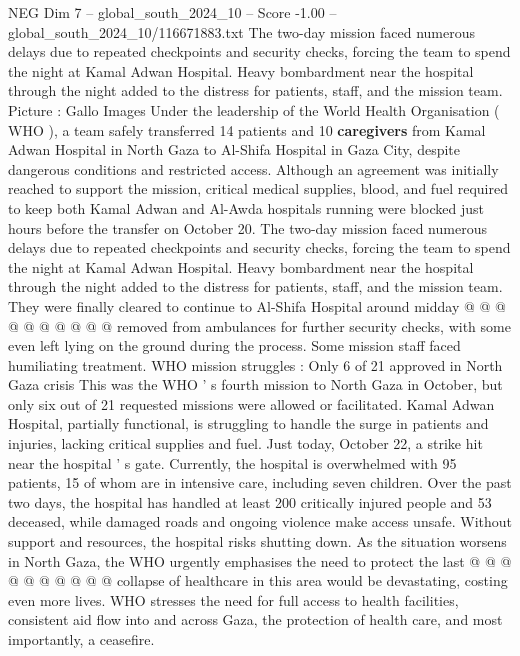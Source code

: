 \begin{textsample}{NEG Dim 7 – global\_south\_2024\_10 – Score -1.00 – global\_south\_2024\_10/116671883.txt}  \label{ex:f7_neg_236}
The two-day mission faced numerous delays due to repeated checkpoints and security checks, forcing the team to spend the night at Kamal Adwan Hospital.
Heavy bombardment near the hospital through the night added to the distress for patients, staff, and the mission team.
Picture : Gallo Images Under the leadership of the World Health Organisation ( WHO ), a team safely transferred 14 patients and 10 \textbf{caregivers} from Kamal Adwan Hospital in North Gaza to Al-Shifa Hospital in Gaza City, despite dangerous conditions and restricted access.
Although an agreement was initially reached to support the mission, critical medical supplies, blood, and fuel required to keep both Kamal Adwan and Al-Awda hospitals running were blocked just hours before the transfer on October 20.
The two-day mission faced numerous delays due to repeated checkpoints and security checks, forcing the team to spend the night at Kamal Adwan Hospital.
Heavy bombardment near the hospital through the night added to the distress for patients, staff, and the mission team.
They were finally cleared to continue to Al-Shifa Hospital around midday @ @ @ @ @ @ @ @ @ @ removed from ambulances for further security checks, with some even left lying on the ground during the process.
Some mission staff faced humiliating treatment.
WHO mission struggles : Only 6 of 21 approved in North Gaza crisis This was the WHO ' s fourth mission to North Gaza in October, but only six out of 21 requested missions were allowed or facilitated.
Kamal Adwan Hospital, partially functional, is struggling to handle the surge in patients and injuries, lacking critical supplies and fuel.
Just today, October 22, a strike hit near the hospital ' s gate.
Currently, the hospital is overwhelmed with 95 patients, 15 of whom are in intensive care, including seven children.
Over the past two days, the hospital has handled at least 200 critically injured people and 53 deceased, while damaged roads and ongoing violence make access unsafe.
Without support and resources, the hospital risks shutting down.
As the situation worsens in North Gaza, the WHO urgently emphasises the need to protect the last @ @ @ @ @ @ @ @ @ @ collapse of healthcare in this area would be devastating, costing even more lives.
WHO stresses the need for full access to health facilities, consistent aid flow into and across Gaza, the protection of health care, and most importantly, a ceasefire.

\end{textsample}
